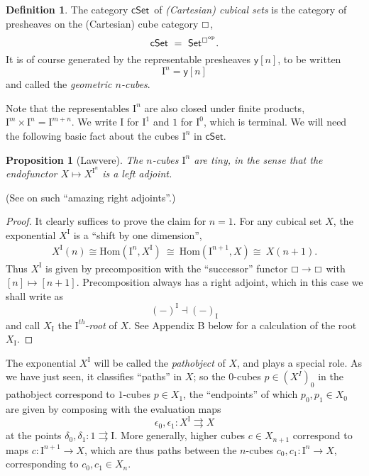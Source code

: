 \documentclass[11pt]{amsart}
\newcommand{\C}{\ensuremath{\boxempty}}
\newcommand{\psh}[1]{\ensuremath{\mathsf{Set}^{#1^{\mathrm{op}}}}}
\newcommand{\cSet}{\ensuremath{\mathsf{cSet}}}
\newcommand{\y}{\ensuremath{\mathsf{y}}} %
\renewcommand{\to}{\ensuremath{\rightarrow}}
\renewcommand{\hom}{\ensuremath{\mathrm{Hom}}}
\newcommand{\I}{\ensuremath{\mathrm{I}}}
\newtheorem{proposition}[theorem]{Proposition}
\theoremstyle{remark}
\theoremstyle{definition}
\newtheorem{definition}[theorem]{Definition}
\begin{document}
\begin{definition}\label{def:cSet}
The category \cSet\ of \emph{(Cartesian) cubical sets} is the category of presheaves on the (Cartesian) cube category $\C$,
\[
\mathsf{cSet}\ =\ \psh{\C}.
\]
It is of course generated by the representable presheaves $\y{[n]}$, to be written $$\I^n = \y{[n]}$$ and called the \emph{geometric $n$-cubes}.   
\end{definition}

Note that the representables $\I^n$ are also closed under finite products, $\I^m \times \I^n = \I^{m+n}$.  We write $\I$ for $\I^1$ and $1$ for $\I^0$, which is terminal.  We will need the following basic fact about the cubes $\I^n$ in $\cSet$.

\begin{proposition}[Lawvere]\label{prop:Itiny}
The $n$-cubes $\I^n$ are \emph{tiny}, in the sense that the endofunctor $X\mapsto X^{\I^n}$ is a left adjoint.
\end{proposition}
\noindent (See \cite{Lawvere} on such ``amazing right adjoints''.)

\begin{proof}
It clearly suffices to prove the claim for $n=1$.   For any cubical set $X$, the exponential $X^\I$ is a ``shift by one dimension'', 
\[
\begin{split}
X^\I(n) \cong \hom(\I^n, X^\I)\ \cong\  \hom(\I^{n+1}, X)\cong\ X(n+1).
\end{split}
\]
Thus $X^\I$ is given by precomposition with the ``successor'' functor $\C\to\C$ with $[n] \mapsto [n+1]$. Precomposition always has a right adjoint, which in this case we shall write as $$(-)^\I\dashv (-)_\I $$ and call $X_\I$ the $\I^{th}$-\emph{root} of $X$.  See Appendix B below for a calculation of the root $X_\I$.
%
\end{proof}

The exponential  $X^\I$ will be called the \emph{pathobject} of $X$, and plays a special role.  As we have just seen, it classifies ``paths'' in $X$; so the $0$-cubes $p \in (X^I)_0$ in the pathobject correspond to $1$-cubes $p\in X_1$, the ``endpoints'' of which $p_0, p_1\in X_0$ are given by composing with the evaluation maps $$\epsilon_0, \epsilon_1 : X^\I \rightrightarrows X$$ at the points $\delta_0, \delta_1 : 1\rightrightarrows \I$. More generally, higher cubes $c\in X_{n+1}$ correspond to maps $c : \I^{n+1}\to X$, which are thus paths between the $n$-cubes $c_0, c_1 : \I^n \to X$, corresponding to $c_0, c_1 \in X_n$.  
\end{document}
